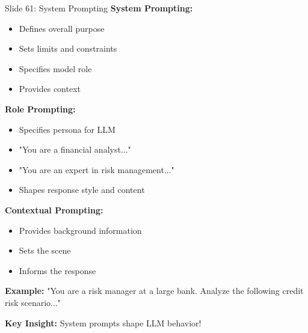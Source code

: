 \documentclass[8pt]{beamer}
\begin{document}
	\begin{frame}{Slide 61: System Prompting}
		\fontsize{6.5}{7.5}\selectfont
		\textbf{System Prompting:}
		\begin{itemize}
			\item Defines overall purpose
			\item Sets limits and constraints
			\item Specifies model role
			\item Provides context
		\end{itemize}
		
		\vspace{0.1cm}
		\textbf{Role Prompting:}
		\begin{itemize}
			\item Specifies persona for LLM
			\item "You are a financial analyst..."
			\item "You are an expert in risk management..."
			\item Shapes response style and content
		\end{itemize}
		
		\vspace{0.1cm}
		\textbf{Contextual Prompting:}
		\begin{itemize}
			\item Provides background information
			\item Sets the scene
			\item Informs the response
		\end{itemize}
		
		\textbf{Example:}
		"You are a risk manager at a large bank. Analyze the following credit risk scenario..."
		
		\textcolor{myblue}{\textbf{Key Insight:}} System prompts shape LLM behavior!
	\end{frame}
	
\end{document}
